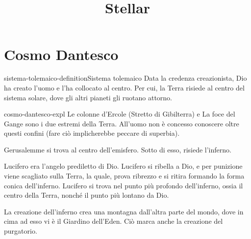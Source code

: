 \documentclass[preview]{standalone}
\begin{document}
\title{Stellar}
\genpage

\section{Cosmo Dantesco}

\begin{snippetdefinition}{sistema-tolemaico-definition}{Sistema tolemaico}
    Data la credenza creazionista, Dio ha creato l'uomo e l'ha collocato al centro.
    Per cui, la Terra risiede al centro del sistema solare, dove gli altri pianeti gli ruotano attorno.
\end{snippetdefinition}

\begin{snippet}{cosmo-dantesco-expl}
    Le colonne d'Ercole (Stretto di Gibilterra) e La foce del Gange
    sono i due estremi della Terra. All'uomo non è concesso conoscere oltre questi confini
    (fare ciò implicherebbe peccare di superbia).
    
    Gerusalemme si trova al centro dell'emisfero. Sotto di esso, risiede l'inferno.
    
    Lucifero era l'angelo prediletto di Dio.
    Lucifero si ribella a Dio, e per punizione viene scagliato sulla Terra, la quale,
    prova ribrezzo e si ritira formando la forma conica dell'inferno. Lucifero si trova nel punto
    più profondo dell'inferno, ossia il centro della Terra, nonché il punto più lontano da Dio.
    
    La creazione dell'inferno crea una montagna dall'altra parte del mondo, dove in cima ad esso
    vi è il Giardino dell'Eden. Ciò marca anche la creazione del purgatorio.
\end{snippet}
\end{document}
